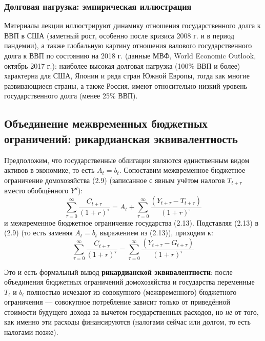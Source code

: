 \documentclass[10pt,a4paper]{article}
\begin{document}
\subsubsection{Долговая нагрузка: эмпирическая иллюстрация}
 
Материалы лекции иллюстрируют динамику отношения государственного долга к ВВП в США (заметный рост, особенно после кризиса 2008 г. и в период пандемии), а также глобальную картину отношения валового государственного долга к ВВП по состоянию на 2018 г. (данные МВФ, World Economic Outlook, октябрь 2017 г.): наиболее высокая долговая нагрузка (100\% ВВП и более) характерна для США, Японии и ряда стран Южной Европы, тогда как многие развивающиеся страны, а также Россия, имеют относительно низкий уровень государственного долга (менее 25\% ВВП).
 
\subsection{Объединение межвременных бюджетных ограничений: рикардианская эквивалентность}
 
Предположим, что государственные облигации являются единственным видом активов в экономике, то есть $A_t = b_t$. Сопоставим межвременное бюджетное ограничение домохозяйства (2.9) (записанное с явным учётом налогов $T_{t+\tau}$ вместо обобщённого $Y^d$):
\begin{equation}
\sum_{\tau=0}^{\infty}\frac{C_{t+\tau}}{(1+r)^\tau} = A_t + \sum_{\tau=0}^{\infty}\frac{(Y_{t+\tau}-T_{t+\tau})}{(1+r)^\tau} \tag{2.9}
\end{equation}
и межвременное бюджетное ограничение государства (2.13). Подставляя (2.13) в (2.9) (то есть заменяя $A_t = b_t$ выражением из (2.13)), приходим к:
\begin{equation}
\sum_{\tau=0}^{\infty}\frac{C_{t+\tau}}{(1+r)^\tau} = \sum_{\tau=0}^{\infty}\frac{(Y_{t+\tau}-G_{t+\tau})}{(1+r)^\tau} \tag{2.14}
\end{equation}
 
\begin{intuition}
Это и есть формальный вывод \textbf{рикардианской эквивалентности}: после объединения бюджетных ограничений домохозяйства и государства переменные $T_t$ и $b_t$ полностью исчезают из совокупного (межвременного) бюджетного ограничения — совокупное потребление зависит только от приведённой стоимости будущего дохода за вычетом государственных расходов, но \emph{не} от того, как именно эти расходы финансируются (налогами сейчас или долгом, то есть налогами позже).
\end{intuition}
 
\end{document}
